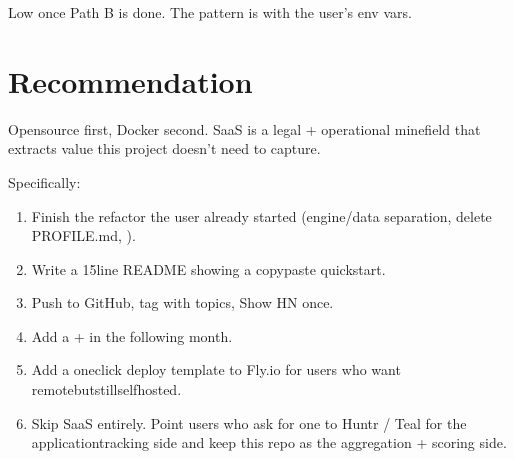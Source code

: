 \documentclass[a4paper,11pt,english]{sphinxmanual}
\begin{document}
\sphinxAtStartPar
{} Low once Path B is done. The pattern is
 with the user’s env vars.


\section{Recommendation}
\label{\detokenize{analysis:recommendation}}
\sphinxAtStartPar
{} Open\sphinxhyphen{}source first, Docker second. SaaS is a
legal + operational minefield that extracts value this project
doesn’t need to capture.

\sphinxAtStartPar
Specifically:
\begin{enumerate}
%
\item {} 
\sphinxAtStartPar
Finish the refactor the user already started
(engine/data separation, delete PROFILE.md, ).

\item {} 
\sphinxAtStartPar
Write a 15\sphinxhyphen{}line README showing a copy\sphinxhyphen{}paste quick\sphinxhyphen{}start.

\item {} 
\sphinxAtStartPar
Push to GitHub, tag with topics, Show HN once.

\item {} 
\sphinxAtStartPar
Add a  +  in the following month.

\item {} 
\sphinxAtStartPar
Add a one\sphinxhyphen{}click deploy template to Fly.io for users who want
remote\sphinxhyphen{}but\sphinxhyphen{}still\sphinxhyphen{}self\sphinxhyphen{}hosted.

\item {} 
\sphinxAtStartPar
Skip SaaS entirely. Point users who ask for one to Huntr / Teal
for the application\sphinxhyphen{}tracking side and keep this repo as the
aggregation + scoring side.

\end{enumerate}
\end{document}

